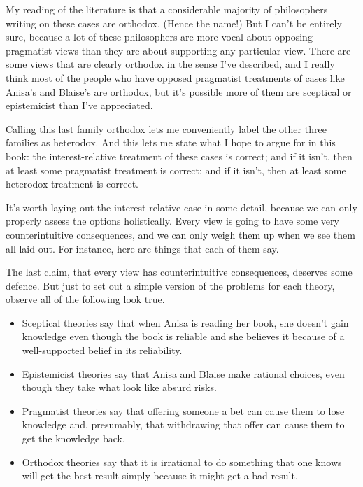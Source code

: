 \documentclass[
  12pt,
  letterpaper,
]{scrbook}
\providecommand{\tightlist}{%
  \setlength{\itemsep}{0pt}\setlength{\parskip}{0pt}}\usepackage{longtable,booktabs,array}
\begin{document}
My reading of the literature is that a considerable majority of
philosophers writing on these cases are orthodox. (Hence the name!) But
I can't be entirely sure, because a lot of these philosophers are more
vocal about opposing pragmatist views than they are about supporting any
particular view. There are some views that are clearly orthodox in the
sense I've described, and I really think most of the people who have
opposed pragmatist treatments of cases like Anisa's and Blaise's are
orthodox, but it's possible more of them are sceptical or epistemicist
than I've appreciated.

Calling this last family orthodox lets me conveniently label the other
three families as heterodox. And this lets me state what I hope to argue
for in this book: the interest-relative treatment of these cases is
correct; and if it isn't, then at least some pragmatist treatment is
correct; and if it isn't, then at least some heterodox treatment is
correct.

It's worth laying out the interest-relative case in some detail, because
we can only properly assess the options holistically. Every view is
going to have some very counterintuitive consequences, and we can only
weigh them up when we see them all laid out. For instance, here are
things that each of them say.

The last claim, that every view has counterintuitive consequences,
deserves some defence. But just to set out a simple version of the
problems for each theory, observe all of the following look true.

\begin{itemize}
\tightlist
\item
  Sceptical theories say that when Anisa is reading her book, she
  doesn't gain knowledge even though the book is reliable and she
  believes it because of a well-supported belief in its reliability.
\item
  Epistemicist theories say that Anisa and Blaise make rational choices,
  even though they take what look like absurd risks.
\item
  Pragmatist theories say that offering someone a bet can cause them to
  lose knowledge and, presumably, that withdrawing that offer can cause
  them to get the knowledge back.
\item
  Orthodox theories say that it is irrational to do something that one
  knows will get the best result simply because it might get a bad
  result.
\end{itemize}
\end{document}
